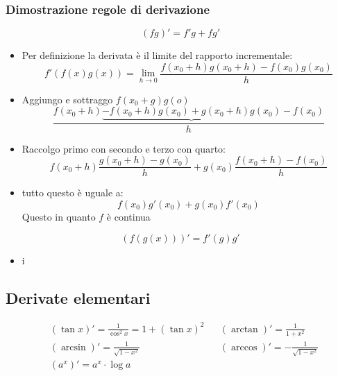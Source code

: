 \subsubsection{Dimostrazione regole di derivazione}
\[
	\boxed{	\left( fg \right) ' =  f'g + fg'}
\]
\begin{itemize}
	\item Per definizione la derivata è il limite del rapporto incrementale:
	      \[
		      f'\left( f\left( x \right) g\left( x \right)  \right) = \lim_{h \to 0} \frac{f\left( x_0 +h \right) g\left( x_0+h \right) - f\left( x_0 \right) g\left( x_0 \right) }{h}
	      \]
	\item Aggiungo e sottraggo $f\left( x_0 +g \right) g\left( o \right) $
	      \[
		      \frac{f\left( x_0+h \right) \underbrace{- f\left( x_0 + h \right) g\left( x_0 \right) + g\left( x_0 + h \right) g\left( x_0 \right)} - f\left( x_0 \right) }{h}
	      \]
	\item Raccolgo primo con secondo e terzo con quarto:
	      \[
		      f\left( x_0 + h \right) \frac{g\left( x_0 +h \right) - g\left( x_0 \right) }{h} + g\left( x_0 \right) \frac{f\left( x_0 + h \right) - f\left( x_0 \right) }{h}
	      \]
	\item tutto questo è uguale a:
	      \[
		      f\left( x_0 \right) g' \left( x_0 \right) + g\left( x_0 \right) f'\left( x_0 \right)
	      \]
	      Questo in quanto $f$ è continua
\end{itemize}
\[
	\boxed{	\left( f\left( g\left( x \right)   \right)  \right) '  =  f'\left( g \right) g'}
\]
\begin{itemize}
	\item
	      i
\end{itemize}
\subsection{Derivate elementari}
\begin{align*}
	 & \left( \tan x \right) ' = \frac{1}{\cos ^2 x}=  1 + \left( \tan x \right) ^2 &  & \left( \arctan  \right) ' =  \frac{1}{1+x^2}         \\
	 & \left( \arcsin \right) ' =  \frac{1}{\sqrt{1-x^2} }                          &  & \left( \arccos \right) ' =  -\frac{1}{\sqrt{1-x^2} } \\
	 & \left( a^{x} \right) ' =  a^{x} \cdot \log a
\end{align*}
